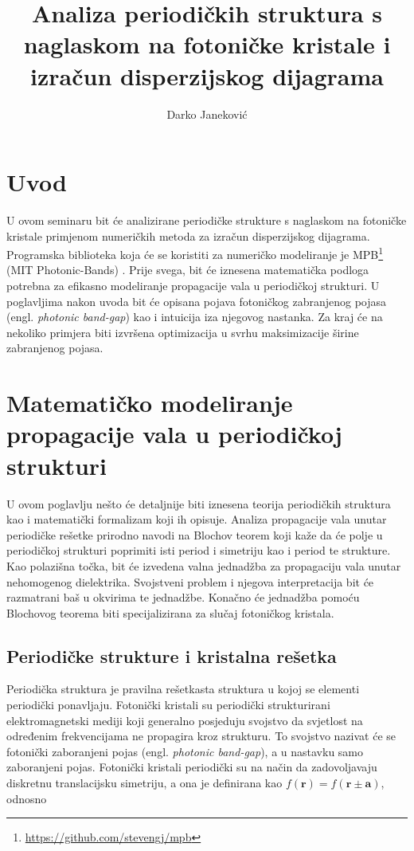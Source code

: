 \documentclass[utf8, seminar, numeric]{fer}
\begin{document}
\title{Analiza periodičkih struktura s naglaskom na fotoničke kristale
	   i izračun disperzijskog dijagrama}
\author{Darko Janeković}

\maketitle

\tableofcontents


\chapter{Uvod}
U ovom seminaru bit će analizirane periodičke strukture s naglaskom na fotoničke
kristale primjenom numeričkih metoda za izračun disperzijskog dijagrama.
Programska biblioteka koja će se koristiti za numeričko modeliranje je
MPB\footnote{\url{https://github.com/stevengj/mpb}} (MIT Photonic-Bands)
\cite{Johnson2001:mpb}. Prije svega, bit će iznesena
matematička podloga potrebna za efikasno modeliranje propagacije vala u
periodičkoj strukturi. U poglavljima nakon uvoda bit će opisana pojava fotoničkog
zabranjenog pojasa (engl. \textit{photonic band-gap}) kao i intuicija iza
njegovog nastanka. Za kraj će na nekoliko primjera biti izvršena optimizacija u
svrhu maksimizacije širine zabranjenog pojasa.


\chapter{Matematičko modeliranje propagacije vala u periodičkoj strukturi}

U ovom poglavlju nešto će detaljnije biti iznesena teorija periodičkih struktura
kao i matematički formalizam koji ih opisuje. Analiza propagacije vala unutar
periodičke rešetke prirodno navodi na Blochov teorem koji kaže da će polje u
periodičkoj strukturi poprimiti isti period i simetriju kao i period te strukture.
Kao polazišna točka, bit će izvedena valna jednadžba za propagaciju vala unutar
nehomogenog dielektrika. Svojstveni problem i njegova interpretacija bit će
razmatrani baš u okvirima te jednadžbe. Konačno će jednadžba pomoću Blochovog
teorema biti specijalizirana za slučaj fotoničkog kristala.


\section{Periodičke strukture i kristalna rešetka}

Periodička struktura je pravilna rešetkasta struktura u kojoj se elementi
periodički ponavljaju. Fotonički kristali su periodički strukturirani
elektromagnetski mediji koji generalno posjeduju svojstvo da svjetlost na
određenim frekvencijama ne propagira kroz strukturu. To svojstvo nazivat će se
fotonički zaboranjeni pojas (engl. \textit{photonic band-gap}), a u nastavku
samo zaboranjeni pojas. Fotonički kristali periodički su na način da
zadovoljavaju diskretnu translacijsku simetriju, a ona je definirana kao
${f(\mathbf{r}) = f(\mathbf{r} \pm \mathbf{a})}$, odnosno
\end{document}
